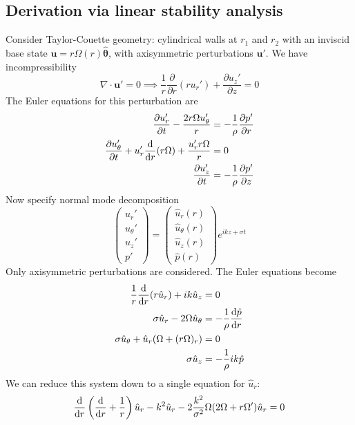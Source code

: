 \documentclass{jknotes}
\renewcommand{\u}{\symbf{u}}
\begin{document}
\subsection{Derivation via linear stability analysis}
Consider Taylor-Couette geometry: cylindrical walls at $r_1$ and $r_2$ with an
inviscid base state $\u = r \Omega(r) \hat{\symbf{\theta}}$, with axisymmetric
perturbations $\u'$. We have incompressibility
\begin{equation}
	\nabla \cdot \u' = 0 \implies \frac{1}{r}\frac{\partial}{\partial
	r}(ru_r') + \frac{\partial u_z'}{\partial z} = 0
\end{equation}
The Euler equations for this perturbation are
\begin{align}
	\frac{\partial u_r'}{\partial t} - \frac{2r \Omega u_\theta'}{r} &=
	-\frac{1}{\rho} \frac{\partial p'}{\partial r} \\
	\frac{\partial u_\theta'}{\partial t} + u_r'\frac{\diffd}{\diffd
r}(r\Omega) + \frac{u_r' r \Omega}{r} &= 0 \\
\frac{\partial u_z'}{\partial t} &= -\frac{1}{\rho}\frac{\partial p'}{\partial
z}
\end{align}
Now specify normal mode decomposition
\begin{equation}
	\begin{pmatrix} u_r' \\ u_\theta' \\ u_z' \\ p' \end{pmatrix} = 
	\begin{pmatrix} \hat{u}_r(r) \\ \hat{u}_\theta(r) \\ \hat{u}_z(r) \\
	\hat{p}(r) \end{pmatrix} e^{ikz + \sigma t}
\end{equation}
Only axisymmetric perturbations are considered. The Euler equations become
\begin{align}
	\frac{1}{r}\frac{\diffd}{\diffd r}(r\hat{u}_r) + ik \hat{u}_z &= 0 \\
	\sigma \hat{u}_r - 2\Omega \hat{u}_\theta &= - \frac{1}{\rho} \frac{\diffd
	\hat{p}}{\diffd r} \\
		\sigma \hat{u}_\theta + \hat{u}_r(\Omega + (r\Omega)_r) &= 0 \\
		\sigma \hat{u}_z &= -\frac{1}{\rho} ik \hat{p}
\end{align}
We can reduce this system down to a single equation for $\hat{u}_r$:
\begin{equation}
	\frac{\diffd}{\diffd r}\left(\frac{\diffd}{\diffd r} +
	\frac{1}{r}\right)\hat{u}_r - k^2 \hat{u}_r -2\frac{k^2}{\sigma^2}
	\Omega(2\Omega + r\Omega')\hat{u}_r = 0
\end{equation}
\end{document}
